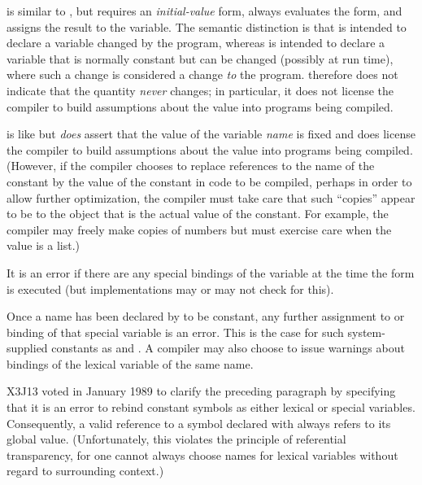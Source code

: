 \begin{defmac}
 is similar to , but  requires
an \emph{initial-value} form, always evaluates the form, and assigns the
result to the variable.  The semantic distinction is that 
is intended to declare a variable changed by the program, whereas
 is intended to declare a variable that is normally
constant but can be changed (possibly at run time), where such a change
is considered a
change \emph{to} the program.   therefore does not indicate
that the quantity \emph{never} changes; in particular, it does not license
the compiler to build assumptions about the value into programs being
compiled.

 is like  but \emph{does} assert that
the value of the variable \emph{name} is fixed and does license
the compiler to build assumptions about the value into programs being
compiled.  (However, if the compiler chooses to replace references
to the name of the constant by the value of the constant in code
to be compiled, perhaps in order to allow further optimization,
the compiler must take care that such ``copies'' appear to be 
to the object that is the actual value of the constant.  For example,
the compiler may freely make copies of numbers but must exercise
care when the value is a list.)

It is an error if there are any special bindings
of the variable at the time the  form
is executed (but implementations may or may not check for this).

Once a name has been declared by  to be constant,
any further assignment to or binding of that special variable is an error.
This is the case for such system-supplied constants as  and
.
A compiler may also choose to issue warnings about bindings of
the lexical variable of the same name.

\begin{new}
X3J13 voted in January 1989
to clarify the preceding paragraph by specifying
that it is an error to rebind constant symbols
as either lexical or special variables.
Consequently, a valid reference to a symbol declared with 
always refers to its global value.
(Unfortunately, this violates the principle of referential transparency,
for one cannot always choose names for lexical variables without regard
to surrounding context.)
\end{new}


\end{defmac}
